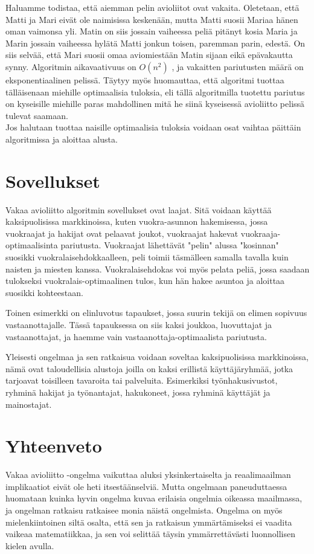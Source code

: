 \documentclass[finnish]{tktltiki2}
\theoremstyle{definition}
\theoremstyle{remark}
\begin{document}
Haluamme todistaa, että aiemman pelin avioliitot ovat vakaita.
Oletetaan, että Matti ja Mari eivät ole naimisissa keskenään, mutta Matti suosii Mariaa hänen oman vaimonsa yli. Matin on siis jossain vaiheessa peliä pitänyt kosia Maria ja Marin jossain vaiheessa hylätä Matti jonkun toisen, paremman parin, edestä. On siis selvää, että Mari suosii omaa aviomiestään Matin sijaan eikä epävakautta synny. \cite[p. 13]{gale62a} Algoritmin aikavaativuus on $O(n^2)$ \cite[p. 588]{Balinski}, ja vakaitten pariutusten määrä on eksponentiaalinen pelissä. \cite[p. 591]{Balinski} Täytyy myös huomauttaa, että algoritmi tuottaa tälläisenaan miehille optimaalisia tuloksia, eli tällä algoritmilla tuotettu pariutus on kyseisille miehille paras mahdollinen mitä he siinä kyseisessä avioliitto pelissä tulevat saamaan.\\
Jos halutaan tuottaa naisille optimaalisia tuloksia voidaan osat vaihtaa päittäin algoritmissa ja aloittaa alusta.


\section{Sovellukset}
Vakaa avioliitto algoritmin sovellukset ovat laajat. Sitä voidaan käyttää kaksipuolisissa markkinoissa, kuten vuokra-asunnon hakemisessa, jossa vuokraajat ja hakijat ovat pelaavat joukot, vuokraajat hakevat vuokraaja-optimaalisinta pariutusta. Vuokraajat lähettävät "pelin" alussa "kosinnan" suosikki vuokralaisehdokkaalleen, peli toimii täsmälleen samalla tavalla kuin naisten ja miesten kanssa.
Vuokralaisehdokas voi myös pelata peliä, jossa saadaan tulokseksi vuokralais-optimaalinen tulos, kun hän hakee asuntoa ja aloittaa suosikki kohteestaan.

Toinen esimerkki on elinluvotus tapaukset, jossa suurin tekijä on elimen sopivuus vastaanottajalle. Tässä tapauksessa on siis kaksi joukkoa, luovuttajat ja vastaanottajat, ja haemme vain vastaanottaja-optimaalista pariutusta.

Yleisesti ongelmaa ja sen ratkaisua voidaan soveltaa kaksipuolisissa markkinoissa, nämä ovat taloudellisia alustoja joilla on kaksi erillistä käyttäjäryhmää, jotka tarjoavat toisilleen tavaroita tai palveluita. Esimerkiksi työnhakusivustot, ryhminä hakijat ja työnantajat, hakukoneet, jossa ryhminä käyttäjät ja mainostajat.


\section{Yhteenveto}
Vakaa avioliitto -ongelma vaikuttaa aluksi yksinkertaiselta ja reaalimaailman implikaatiot eivät ole heti itsestäänselviä. Mutta ongelmaan paneuduttaessa huomataan kuinka hyvin ongelma kuvaa erilaisia ongelmia oikeassa maailmassa, ja ongelman ratkaisu ratkaisee monia näistä ongelmista.
Ongelma on myös mielenkiintoinen siltä osalta, että sen ja ratkaisun ymmärtämiseksi ei vaadita vaikeaa matematiikkaa, ja sen voi selittää täysin ymmärrettävästi luonnollisen kielen avulla.
\end{document}
